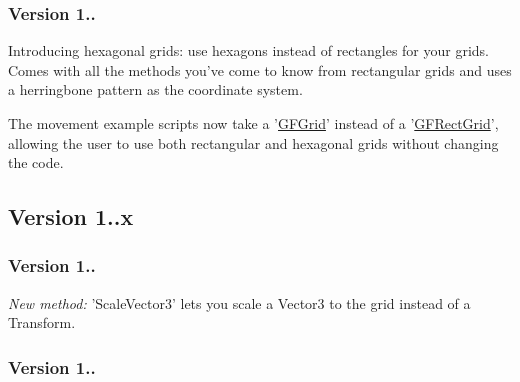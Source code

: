 \subsubsection*{Version 1..}

Introducing hexagonal grids\+: use hexagons instead of rectangles for your grids. Comes with all the methods you've come to know from rectangular grids and uses a herringbone pattern as the coordinate system.
\begin{DoxyItemize}
\item The movement example scripts now take a '\hyperlink{class_g_f_grid}{G\+F\+Grid}' instead of a '\hyperlink{class_g_f_rect_grid}{G\+F\+Rect\+Grid}', allowing the user to use both rectangular and hexagonal grids without changing the code. 


\end{DoxyItemize}

\subsection*{Version 1..\+x }

\subsubsection*{Version 1..}


\begin{DoxyItemize}
\item {\itshape New method\+:} 'Scale\+Vector3' lets you scale a {\ttfamily Vector3} to the grid instead of a {\ttfamily Transform}.
\end{DoxyItemize}

\subsubsection*{Version 1..}


